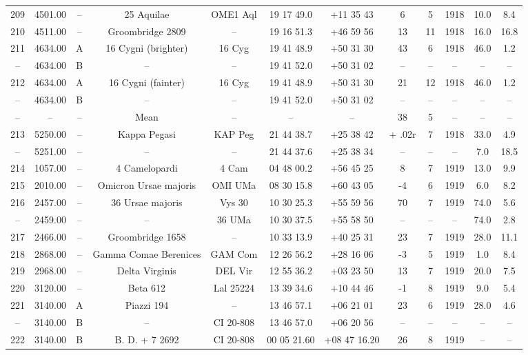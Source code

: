 \begin{table}
\begin{tabular}{cccccccccccc}
209 & 4501.00 & -- & 25 Aquilae & OME1 Aql & 19 17 49.0 & +11 35 43 & 6 & 5 & 1918 & 10.0 & 8.4 \\
210 & 4511.00 & -- & Groombridge 2809 & -- & 19 16 51.3 & +46 59 56 & 13 & 11 & 1918 & 16.0 & 16.8 \\
211 & 4634.00 & A & 16 Cygni (brighter) & 16 Cyg & 19 41 48.9 & +50 31 30 & 43 & 6 & 1918 & 46.0 & 1.2 \\
-- & 4634.00 & B & -- & -- & 19 41 52.0 & +50 31 02 & -- & -- & -- & -- & -- \\
212 & 4634.00 & A & 16 Cygni (fainter) & 16 Cyg & 19 41 48.9 & +50 31 30 & 21 & 12 & 1918 & 46.0 & 1.2 \\
-- & 4634.00 & B & -- & -- & 19 41 52.0 & +50 31 02 & -- & -- & -- & -- & -- \\
-- & -- & -- & Mean & -- & -- & -- & 38 & 5 & -- & -- & -- \\
213 & 5250.00 & -- & Kappa Pegasi & KAP Peg & 21 44 38.7 & +25 38 42 & + .02r & 7 & 1918 & 33.0 & 4.9 \\
-- & 5251.00 & -- & -- & -- & 21 44 37.6 & +25 38 34 & -- & -- & -- & 7.0 & 18.5 \\
214 & 1057.00 & -- & 4 Camelopardi & 4 Cam & 04 48 00.2 & +56 45 25 & 8 & 7 & 1919 & 13.0 & 9.9 \\
215 & 2010.00 & -- & Omicron Ursae majoris & OMI UMa & 08 30 15.8 & +60 43 05 & -4 & 6 & 1919 & 6.0 & 8.2 \\
216 & 2457.00 & -- & 36 Ursae majoris & Vys 30 & 10 30 25.3 & +55 59 56 & 70 & 7 & 1919 & 74.0 & 5.6 \\
-- & 2459.00 & -- & -- & 36 UMa & 10 30 37.5 & +55 58 50 & -- & -- & -- & 74.0 & 2.8 \\
217 & 2466.00 & -- & Groombridge 1658 & -- & 10 33 13.9 & +40 25 31 & 23 & 7 & 1919 & 28.0 & 11.1 \\
218 & 2868.00 & -- & Gamma Comae Berenices & GAM Com & 12 26 56.2 & +28 16 06 & -3 & 5 & 1919 & 1.0 & 8.4 \\
219 & 2968.00 & -- & Delta Virginis & DEL Vir & 12 55 36.2 & +03 23 50 & 13 & 7 & 1919 & 20.0 & 7.5 \\
220 & 3120.00 & -- & Beta 612 & Lal 25224 & 13 39 34.6 & +10 44 46 & -1 & 8 & 1919 & 9.0 & 5.4 \\
221 & 3140.00 & A & Piazzi 194 & -- & 13 46 57.1 & +06 21 01 & 23 & 6 & 1919 & 28.0 & 4.6 \\
-- & 3140.00 & B & -- & CI 20-808 & 13 46 57.0 & +06 20 56 & -- & -- & -- & -- & -- \\
222 & 3140.00 & B & B. D. + 7  2692 & CI 20-808 & 00 05 21.60 & +08 47 16.20 & 26 & 8 & 1919 & -- & -- \\

\end{tabular}
\end{table}
